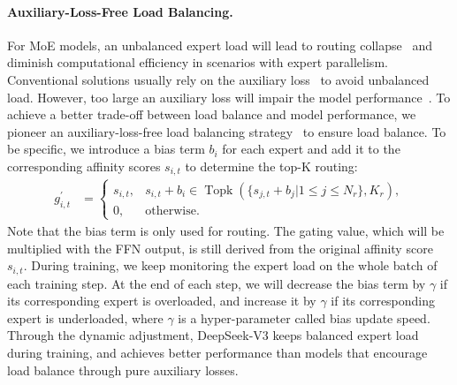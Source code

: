 \documentclass[11pt, a4paper, logo, copyright, nonumbering]{deepseek}
\newcommand{\dsviii}{DeepSeek-V3}
\begin{document}
\begin{CJK*}{UTF8}{gbsn}
\paragraph{Auxiliary-Loss-Free Load Balancing.}
For MoE models, an unbalanced expert load will lead to routing collapse~\citep{moe} and diminish computational efficiency in scenarios with expert parallelism. 
Conventional solutions usually rely on the auxiliary loss~\citep{switch,gshard} to avoid unbalanced load. 
However, too large an auxiliary loss will impair the model performance~\citep{noaux_tc}. 
To achieve a better trade-off between load balance and model performance, we pioneer an auxiliary-loss-free load balancing strategy~\citep{noaux_tc} to ensure load balance. 
To be specific, we introduce a bias term $b_i$ for each expert and add it to the corresponding affinity scores $s_{i,t}$ to determine the top-K routing:
\begin{align}
    g^{\prime}_{i,t} & = \begin{cases} 
    s_{i,t}, & s_{i,t} + b_i \in \operatorname{Topk} (\{ s_{j, t} + b_j | 1 \leq j \leq N_r \}, K_{r}), \\
    0, & \text{otherwise}.
    \end{cases}
\end{align}
Note that the bias term is only used for routing.
The gating value, which will be multiplied with the FFN output, is still derived from the original affinity score $s_{i,t}$.
During training, we keep monitoring the expert load on the whole batch of each training step.
At the end of each step, we will decrease the bias term by $\gamma$ if its corresponding expert is overloaded, and increase it by $\gamma$ if its corresponding expert is underloaded, where $\gamma$ is a hyper-parameter called bias update speed.
Through the dynamic adjustment, \dsviii{} keeps balanced expert load during training, and achieves better performance than models that encourage load balance through pure auxiliary losses.


\end{CJK*}
\end{document}
